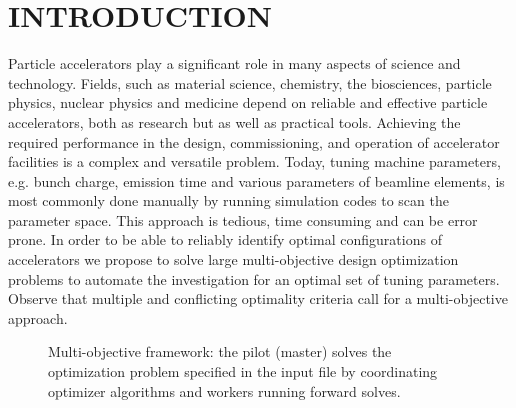 \documentclass[%
preprint,
preprint,
linenumbers,
amsmath,amssymb,
aps,
prstab,
]{revtex4-1}
\begin{document}
\maketitle


\section{INTRODUCTION} \label{sec:introduction}

Particle accelerators play a significant role in many aspects of science and
  technology.
Fields, such as material science, chemistry, the biosciences, particle
  physics, nuclear physics and medicine depend on reliable and effective
  particle accelerators, both as research but as well as practical tools.
Achieving the required performance in the design, commissioning, and operation
  of accelerator facilities is a complex and versatile problem.
Today, tuning machine parameters, e.g. bunch charge, emission time and
  various parameters of beamline elements, is most commonly done manually by
  running simulation codes to scan the parameter space.
This approach is tedious, time consuming and can be error prone.
In order to be able to reliably identify optimal configurations of
  accelerators we propose to solve large multi-objective design optimization
  problems to automate the investigation for an optimal set of tuning
  parameters.
Observe that multiple and conflicting optimality criteria call for a
  multi-objective approach.

\begin{figure}%
	\scalebox{0.8}{
	\pgfdeclarelayer{background}
	\pgfsetlayers{background,main}
	\begin{tikzpicture}[text=black]%
	
	\end{tikzpicture}
}
\caption{Multi-objective framework: the pilot (master) solves the
	optimization problem specified in the input file by coordinating optimizer
	algorithms and workers running forward solves.}
\label{fig:framenetwork}
\end{figure}
\end{document}

